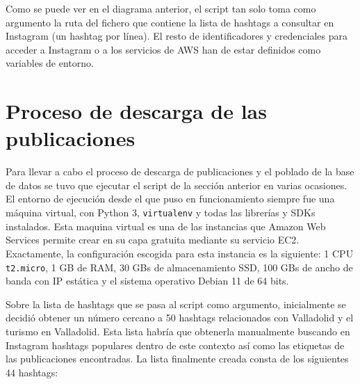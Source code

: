 Como se puede ver en el diagrama anterior, el script tan solo toma como argumento la ruta del fichero que contiene la lista de hashtags a consultar en Instagram (un hashtag por línea). El resto de identificadores y credenciales para acceder a Instagram o a los servicios de AWS han de estar definidos como variables de entorno.

\section{Proceso de descarga de las publicaciones}
\label{sect:descarga_publicaciones}

Para llevar a cabo el proceso de descarga de publicaciones y el poblado de la base de datos se tuvo que ejecutar el script de la sección anterior en varias ocasiones. El entorno de ejecución desde el que puso en funcionamiento siempre fue una máquina virtual, con Python 3, \texttt{virtualenv} y todas las librerías y SDKs instalados. Esta maquina virtual es una de las instancias que Amazon Web Services permite crear en su capa gratuita mediante su servicio EC2. Exactamente, la configuración escogida para esta instancia es la siguiente: 1 CPU \texttt{t2.micro}, 1 GB de RAM, 30 GBs de almacenamiento SSD, 100 GBs de ancho de banda con IP estática y el sistema operativo Debian 11 de 64 bits.

Sobre la lista de hashtags que se pasa al script como argumento, inicialmente se decidió obtener un número cercano a 50 hashtags relacionados con Valladolid y el turismo en Valladolid. Esta lista habría que obtenerla manualmente buscando en Instagram hashtags populares dentro de este contexto así como las etiquetas de las publicaciones encontradas. La lista finalmente creada consta de los siguientes 44 hashtags:

